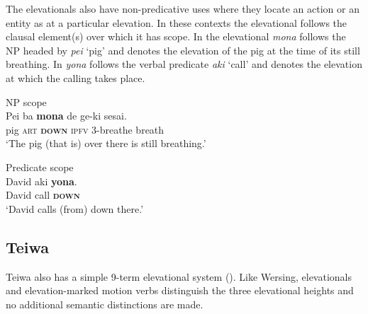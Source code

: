   



   

The elevationals also have non-predicative uses where they locate an action or an entity as at a particular elevation. In these contexts the elevational follows the clausal element(s) over which it has scope. In  the elevational \textit{mona} follows the NP headed by \textit{pei} `pig' and denotes the elevation of the pig at the time of its still breathing. In  \textit{yona} follows the verbal predicate \textit{aki} `call' and denotes the elevation at which the calling takes place. 


\ea%
\label{ex:7:4}
\upshape
 NP scope
 \\
\gll   Pei   ba            \textbf{{mona}}      de                       ge-ki{\ng}  sesai.\\
       pig  \textsc{art} \textbf{\textsc{down}} \textsc{ipfv} \textsc{3-}breathe  breath \\
\glt  `The pig (that is) over there is still breathing.'
\z

 

 



\ea%
\label{ex:7:5}
\upshape
Predicate scope    
 \\
\gll David   aki  \textbf{{yona}}{.} \\
       David  call  \textbf{\textsc{down}} \\
\glt `David calls (from) down there.'
\z

  

 

 

\subsection{Teiwa}
Teiwa also has a simple 9-term elevational system (). Like Wersing, elevationals and elevation-marked motion verbs distinguish the three elevational heights and no additional semantic distinctions are made.

